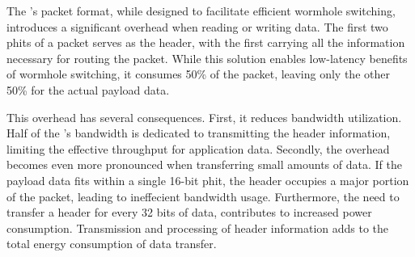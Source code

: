 The \confignoc{}'s packet format, while designed to facilitate efficient wormhole switching, introduces a significant overhead when reading or writing data.
The first two phits of a packet serves as the header, with the first carrying all the information necessary for routing the packet.
While this solution enables low-latency benefits of wormhole switching, it consumes 50\% of the packet, leaving only the other 50\% for the actual payload data.

This overhead has several consequences.
First, it reduces bandwidth utilization.
Half of the \confignoc{}'s bandwidth is dedicated to transmitting the header information, limiting the effective throughput for application data.
Secondly, the overhead becomes even more pronounced when transferring small amounts of data.
If the payload data fits within a single 16-bit phit, the header occupies a major portion of the packet, leading to ineffecient bandwidth usage.
Furthermore, the need to transfer a header for every 32 bits of data, contributes to increased power consumption.
Transmission and processing of header information adds to the total energy consumption of data transfer.
